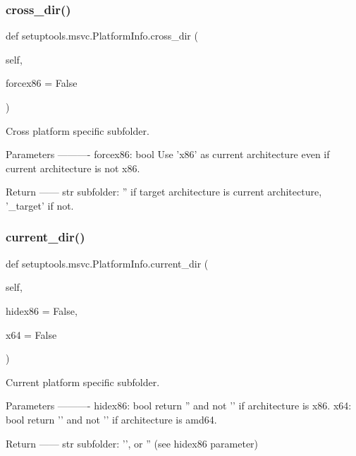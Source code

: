 \subsubsection{\texorpdfstring{cross\+\_\+dir()}{cross\_dir()}}
{\footnotesize\ttfamily def setuptools.\+msvc.\+Platform\+Info.\+cross\+\_\+dir (\begin{DoxyParamCaption}\item[{}]{self,  }\item[{}]{forcex86 = {\ttfamily False} }\end{DoxyParamCaption})}

\begin{DoxyVerb}Cross platform specific subfolder.

Parameters
----------
forcex86: bool
    Use 'x86' as current architecture even if current architecture is
    not x86.

Return
------
str
    subfolder: '' if target architecture is current architecture,
    '\current_target' if not.
\end{DoxyVerb}
 \mbox{\label{classsetuptools_1_1msvc_1_1PlatformInfo_a5d8f69638b5c98cc654174f4c944d1ab}} 
\subsubsection{\texorpdfstring{current\+\_\+dir()}{current\_dir()}}
{\footnotesize\ttfamily def setuptools.\+msvc.\+Platform\+Info.\+current\+\_\+dir (\begin{DoxyParamCaption}\item[{}]{self,  }\item[{}]{hidex86 = {\ttfamily False},  }\item[{}]{x64 = {\ttfamily False} }\end{DoxyParamCaption})}

\begin{DoxyVerb}Current platform specific subfolder.

Parameters
----------
hidex86: bool
    return '' and not '' if architecture is x86.
x64: bool
    return '' and not '' if architecture is amd64.

Return
------
str
    subfolder: '\target', or '' (see hidex86 parameter)
\end{DoxyVerb}
 \mbox{\label{classsetuptools_1_1msvc_1_1PlatformInfo_a09c58742017714dfae07c6604e3f837b}} 
